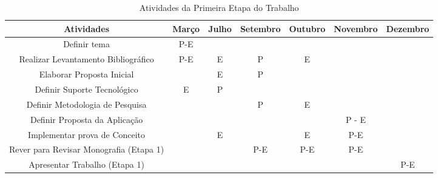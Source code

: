 \begin{table}[ht]
	\centering
	\caption{Atividades da Primeira Etapa do Trabalho}
	\label{tab04}
	
	\begin{tabular}{ccccccc}
		\toprule
		\textbf{Atividades} & \textbf{Março} & 
		\textbf{Julho}  & \textbf{Setembro}& \textbf{Outubro} & \textbf{Novembro} & \textbf{Dezembro}\\
		\midrule
		Definir tema & P-E & & &  &\\
		\midrule
		\begin{minipage} [t] {0.2\textwidth} \centering Realizar Levantamento Bibliográfico \end{minipage} & P-E & E & P & E & & \\
		\midrule
		\begin{minipage} [t] {0.2\textwidth} \centering Elaborar Proposta Inicial\end{minipage} &  & E & P &  &  &\\
		\midrule
		\begin{minipage} [t] {0.2\textwidth} \centering Definir Suporte Tecnológico \end{minipage} & E & P & &  & &\\
		\midrule
		\begin{minipage} [t] {0.2\textwidth} \centering Definir Metodologia de Pesquisa\end{minipage} &  &  & P & E & &\\
		\midrule
		\begin{minipage} [t] {0.2\textwidth} \centering Definir Proposta da Aplicação \end{minipage} &  & & &  & P - E &\\
		\midrule
		\begin{minipage} [t] {0.2\textwidth} \centering Implementar prova de Conceito \end{minipage} &  & E & & E & P-E &\\
		\midrule
		\begin{minipage} [t] {0.2\textwidth} \centering Rever para Revisar Monografia (Etapa 1) \end{minipage} &  & & P-E & P-E & P-E &\\
		\midrule
		\begin{minipage} [t] {0.2\textwidth} \centering Apresentar Trabalho (Etapa 1) \end{minipage} &  &  & &  & & P-E\\
		\bottomrule
	\end{tabular}
\end{table}


